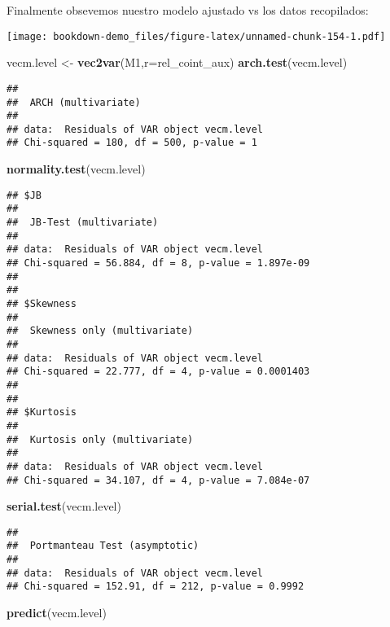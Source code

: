 \documentclass[]{book}
\newenvironment{Shaded}{\begin{snugshade}}{\end{snugshade}}
\newcommand{\KeywordTok}[1]{\textcolor[rgb]{0.13,0.29,0.53}{\textbf{#1}}}
\newcommand{\DataTypeTok}[1]{\textcolor[rgb]{0.13,0.29,0.53}{#1}}
\newcommand{\StringTok}[1]{\textcolor[rgb]{0.31,0.60,0.02}{#1}}
\newcommand{\NormalTok}[1]{#1}
\theoremstyle{definition}
\theoremstyle{definition}
\theoremstyle{definition}
\theoremstyle{remark}
\begin{document}
Finalmente obsevemos nuestro modelo ajustado vs los datos recopilados:

\texttt{[image: bookdown-demo\_files/figure-latex/unnamed-chunk-154-1.pdf]}

\begin{Shaded}
\begin{Highlighting}[]
\NormalTok{vecm.level <-}\StringTok{ }\KeywordTok{vec2var}\NormalTok{(M1,}\DataTypeTok{r=}\NormalTok{rel_coint_aux)}
\KeywordTok{arch.test}\NormalTok{(vecm.level)}
\end{Highlighting}
\end{Shaded}

\begin{verbatim}
## 
##  ARCH (multivariate)
## 
## data:  Residuals of VAR object vecm.level
## Chi-squared = 180, df = 500, p-value = 1
\end{verbatim}

\begin{Shaded}
\begin{Highlighting}[]
\KeywordTok{normality.test}\NormalTok{(vecm.level)}
\end{Highlighting}
\end{Shaded}

\begin{verbatim}
## $JB
## 
##  JB-Test (multivariate)
## 
## data:  Residuals of VAR object vecm.level
## Chi-squared = 56.884, df = 8, p-value = 1.897e-09
## 
## 
## $Skewness
## 
##  Skewness only (multivariate)
## 
## data:  Residuals of VAR object vecm.level
## Chi-squared = 22.777, df = 4, p-value = 0.0001403
## 
## 
## $Kurtosis
## 
##  Kurtosis only (multivariate)
## 
## data:  Residuals of VAR object vecm.level
## Chi-squared = 34.107, df = 4, p-value = 7.084e-07
\end{verbatim}

\begin{Shaded}
\begin{Highlighting}[]
\KeywordTok{serial.test}\NormalTok{(vecm.level)}
\end{Highlighting}
\end{Shaded}

\begin{verbatim}
## 
##  Portmanteau Test (asymptotic)
## 
## data:  Residuals of VAR object vecm.level
## Chi-squared = 152.91, df = 212, p-value = 0.9992
\end{verbatim}

\begin{Shaded}
\begin{Highlighting}[]
\KeywordTok{predict}\NormalTok{(vecm.level)}
\end{Highlighting}
\end{Shaded}
\end{document}

